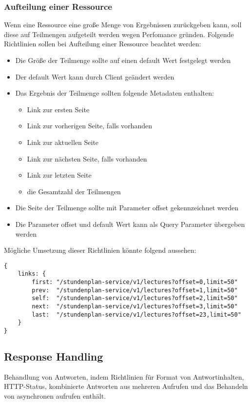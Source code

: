 \subsubsection{Aufteilung einer Ressource}
Wenn eine Ressource eine große Menge von Ergebnissen zurückgeben kann, soll diese auf Teilmengen aufgeteilt werden wegen Perfomance gründen. Folgende Richtlinien sollen bei Aufteilung einer Ressource beachtet werden:

\begin{itemize}
\item Die Größe der Teilmenge sollte auf einen default Wert festgelegt werden
\item Der default Wert kann durch Client geändert werden
\item Das Ergebnis der Teilmenge sollten folgende Metadaten enthalten:
	\begin{itemize}
	\item Link zur ersten Seite
	\item Link zur vorherigen Seite, falls vorhanden
	\item Link zur aktuellen Seite
	\item Link zur nächsten Seite, falls vorhanden
	\item Link zur letzten Seite
	\item die Gesamtzahl der Teilmengen
	\end{itemize}
\item Die Seite der Teilmenge sollte mit Parameter \glqq offset\grqq{} gekennzeichnet werden
\item Die Parameter offset und default Wert kann als Query Parameter übergeben werden
\end{itemize}
Mögliche Umsetzung dieser Richtlinien könnte folgend aussehen:
\begin{verbatim}
{ 
    links: {
        first: "/stundenplan-service/v1/lectures?offset=0,limit=50"
        prev:  "/stundenplan-service/v1/lectures?offset=1,limit=50"
        self:  "/stundenplan-service/v1/lectures?offset=2,limit=50"
        next:  "/stundenplan-service/v1/lectures?offset=3,limit=50"
        last:  "/stundenplan-service/v1/lectures?offset=23,limit=50"
    }
}
\end{verbatim} 

\subsection{Response Handling}
Behandlung von Antworten, indem Richtlinien für Format von Antwortinhalten, HTTP-Status, kombinierte Antworten aus mehreren Aufrufen und das Behandeln von asynchronen aufrufen enthält. 

